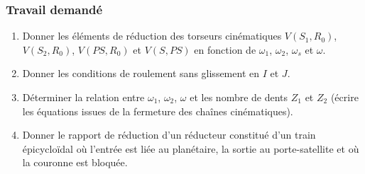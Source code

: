 \subsubsection{Travail demandé}
\begin{enumerate}
\item Donner les éléments de réduction des torseurs cinématiques $V(S_1,R_0)$, $V(S_2,R_0)$, $V(PS,R_0)$ et $V(S,PS)$ en fonction de $\omega_1$, $\omega_2$, $\omega_s$ et $\omega$.
\item Donner les conditions de roulement sans glissement en $I$ et $J$.
\item Déterminer la relation entre $\omega_1$, $\omega_2$, $\omega$ et les nombre de dents $Z_1$ et $Z_2$ (écrire les équations issues de la fermeture des chaînes cinématiques).
\item Donner le rapport de réduction d’un réducteur constitué d’un train épicycloïdal où l’entrée est liée au planétaire, la sortie au porte-satellite et où la couronne est bloquée.
\end{enumerate}

\newpage

